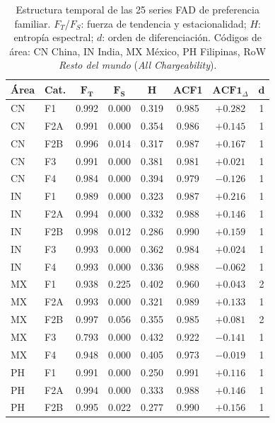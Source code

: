 \documentclass[12pt,letterpaper]{report}
\begin{document}
\begin{table}[htbp]
\centering
\footnotesize
\caption[Características estructurales de las series]{Estructura temporal de las 25 series FAD de preferencia familiar. $F_T$/$F_S$: fuerza de tendencia y estacionalidad; $H$: entropía espectral; $d$: orden de diferenciación. Códigos de área: CN China, IN India, MX México, PH Filipinas, RoW \textit{Resto del mundo} (\textit{All Chargeability}).}
\label{tab:features_estructura}
\begin{tabular}{llcccccc}
\toprule
\rowcolor{uacjblue!15}
\textbf{Área} & \textbf{Cat.} & $\mathbf{F_T}$ & $\mathbf{F_S}$ & $\mathbf{H}$ & \textbf{ACF1} & $\mathbf{ACF1}_{\Delta}$ & $\mathbf{d}$ \\ \midrule
CN & F1 & 0.992 & 0.000 & 0.319 & 0.985 & $+0.282$ & 1 \\
CN & F2A & 0.991 & 0.000 & 0.354 & 0.986 & $+0.145$ & 1 \\
CN & F2B & 0.996 & 0.014 & 0.317 & 0.987 & $+0.167$ & 1 \\
CN & F3 & 0.991 & 0.000 & 0.381 & 0.981 & $+0.021$ & 1 \\
CN & F4 & 0.984 & 0.000 & 0.394 & 0.979 & $-0.126$ & 1 \\
IN & F1 & 0.989 & 0.000 & 0.323 & 0.987 & $+0.216$ & 1 \\
IN & F2A & 0.994 & 0.000 & 0.332 & 0.988 & $+0.146$ & 1 \\
IN & F2B & 0.998 & 0.012 & 0.286 & 0.990 & $+0.159$ & 1 \\
IN & F3 & 0.993 & 0.000 & 0.362 & 0.984 & $+0.024$ & 1 \\
IN & F4 & 0.993 & 0.000 & 0.336 & 0.988 & $-0.062$ & 1 \\
MX & F1 & 0.938 & 0.225 & 0.402 & 0.960 & $+0.043$ & 2 \\
MX & F2A & 0.993 & 0.000 & 0.321 & 0.989 & $+0.133$ & 1 \\
MX & F2B & 0.997 & 0.056 & 0.355 & 0.985 & $+0.081$ & 2 \\
MX & F3 & 0.793 & 0.000 & 0.432 & 0.922 & $-0.141$ & 1 \\
MX & F4 & 0.948 & 0.000 & 0.405 & 0.973 & $-0.019$ & 1 \\
PH & F1 & 0.991 & 0.000 & 0.250 & 0.991 & $+0.116$ & 1 \\
PH & F2A & 0.994 & 0.000 & 0.333 & 0.988 & $+0.146$ & 1 \\
PH & F2B & 0.995 & 0.022 & 0.277 & 0.990 & $+0.156$ & 1 \\

\end{tabular}
\end{table}
\end{document}
